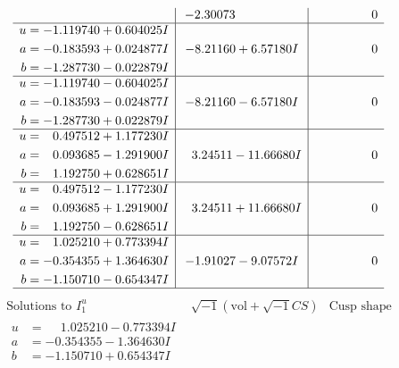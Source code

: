 \documentclass[1p]{elsarticle_modified}
\theoremstyle{definition}
\newcommand{\I}{\sqrt{-1}}
\begin{document}
$$\begin{array}{c|c|c}
 & -2.30073\phantom{ +0.000000I} & \phantom{-0.000000 } 0 \\ \hline\begin{aligned}
u &= -1.119740 + 0.604025 I \\
a &= -0.183593 + 0.024877 I \\
b &= -1.287730 - 0.022879 I\end{aligned}
 & -8.21160 + 6.57180 I & \phantom{-0.000000 } 0 \\ \hline\begin{aligned}
u &= -1.119740 - 0.604025 I \\
a &= -0.183593 - 0.024877 I \\
b &= -1.287730 + 0.022879 I\end{aligned}
 & -8.21160 - 6.57180 I & \phantom{-0.000000 } 0 \\ \hline\begin{aligned}
u &= \phantom{-}0.497512 + 1.177230 I \\
a &= \phantom{-}0.093685 - 1.291900 I \\
b &= \phantom{-}1.192750 + 0.628651 I\end{aligned}
 & \phantom{-}3.24511 - 11.66680 I & \phantom{-0.000000 } 0 \\ \hline\begin{aligned}
u &= \phantom{-}0.497512 - 1.177230 I \\
a &= \phantom{-}0.093685 + 1.291900 I \\
b &= \phantom{-}1.192750 - 0.628651 I\end{aligned}
 & \phantom{-}3.24511 + 11.66680 I & \phantom{-0.000000 } 0 \\ \hline\begin{aligned}
u &= \phantom{-}1.025210 + 0.773394 I \\
a &= -0.354355 + 1.364630 I \\
b &= -1.150710 - 0.654347 I\end{aligned}
 & -1.91027 - 9.07572 I & \phantom{-0.000000 } 0\\
 \hline 
 \end{array}$$\newpage$$\begin{array}{c|c|c}  
\text{Solutions to }I^u_{1}& \I (\text{vol} + \sqrt{-1}CS) & \text{Cusp shape}\\
 \hline 
\begin{aligned}
u &= \phantom{-}1.025210 - 0.773394 I \\
a &= -0.354355 - 1.364630 I \\
b &= -1.150710 + 0.654347 I\end{aligned}

\end{array}$$
\end{document}
